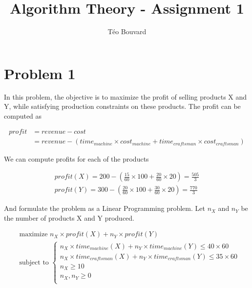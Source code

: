 \documentclass[a4paper, 10pt, twoside]{article}
\begin{document}
\title{Algorithm Theory - Assignment 1}
\author{T\'eo Bouvard}
\maketitle

\section*{Problem 1}
In this problem, the objective is to maximize the profit of selling products X and Y, while satisfying production constraints on these products. The profit can be computed as

\begin{align*}
    profit & = revenue - cost                                                                              \\
           & = revenue - (time_{machine} \times cost_{machine} + time_{craftsman} \times cost_{craftsman})
\end{align*}

We can compute profits for each of the products

\begin{align*}
    profit(X) = 200 - (\frac{15}{60} \times 100 + \frac{20}{60} \times 20) = \frac{505}{3} \\
    profit(Y) = 300 - (\frac{20}{60} \times 100 + \frac{30}{60} \times 20) = \frac{770}{3}
\end{align*}

And formulate the problem as a Linear Programming problem. Let $n_X$ and $n_Y$ be the number of products X and Y produced.

\begin{align*}
     & \text{maximize } n_X \times profit(X) + n_Y \times profit(Y) \\
     & \text{subject to }
    \begin{cases}
        n_X \times time_{machine}(X) + n_Y \times time_{machine}(Y) \le 40 \times 60     \\
        n_X \times time_{craftsman}(X) + n_Y \times time_{craftsman}(Y) \le 35 \times 60 \\
        n_X \ge 10                                                                       \\
        n_X, n_Y \ge 0                                                                   \\
    \end{cases}
\end{align*}
\end{document}
